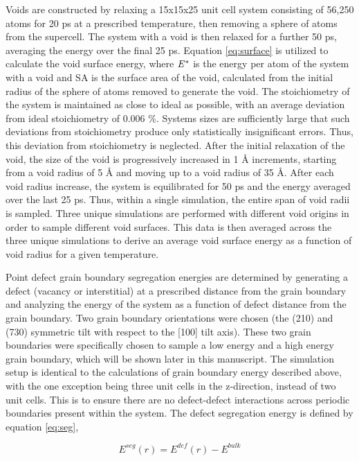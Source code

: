 \documentclass[review]{elsarticle}
\begin{document}
Voids are constructed by relaxing a 15x15x25 unit cell system consisting of 56,250 atoms for 20 ps at a prescribed temperature, then removing a sphere of atoms from the supercell. The system with a void is then relaxed for a further 50 ps, averaging the energy over the final 25 ps. Equation \ref{eq:surface} is utilized to calculate the void surface energy, where $\it{E^{*}}$ is the energy per atom of the system with a void and SA is the surface area of the void, calculated from the initial radius of the sphere of atoms removed to generate the void. The stoichiometry of the system is maintained as close to ideal as possible, with an average deviation from ideal stoichiometry of 0.006 {\%}. Systems sizes are sufficiently large that such deviations from stoichiometry produce only statistically insignificant errors. Thus, this deviation from stoichiometry is neglected. After the initial relaxation of the void, the size of the void is progressively increased in 1 {\AA} increments, starting from a void radius of 5 {\AA} and moving up to a void radius of 35 {\AA}. After each void radius increase, the system is equilibrated for 50 ps and the energy averaged over the last 25 ps. Thus, within a single simulation, the entire span of void radii is sampled. Three unique simulations are performed with different void origins in order to sample different void surfaces. This data is then averaged across the three unique simulations to derive an average void surface energy as a function of void radius for a given temperature. 

Point defect grain boundary segregation energies are determined by generating a defect (vacancy or interstitial) at a prescribed distance from the grain boundary and analyzing the energy of the system as a function of defect distance from the grain boundary. Two grain boundary orientations were chosen (the (210) and (730) symmetric tilt with respect to the [100] tilt axis). These two grain boundaries were specifically chosen to sample a low energy and a high energy grain boundary, which will be shown later in this manuscript. The simulation setup is identical to the calculations of grain boundary energy described above, with the one exception being three unit cells in the z-direction, instead of two unit cells. This is to ensure there are no defect-defect interactions across periodic boundaries present within the system. The defect segregation energy is defined by equation \ref{eq:seg},

\begin{equation}
\label{eq:seg}
E^{seg}(r)= E^{def}(r) - E^{bulk}
\end{equation}
\end{document}
